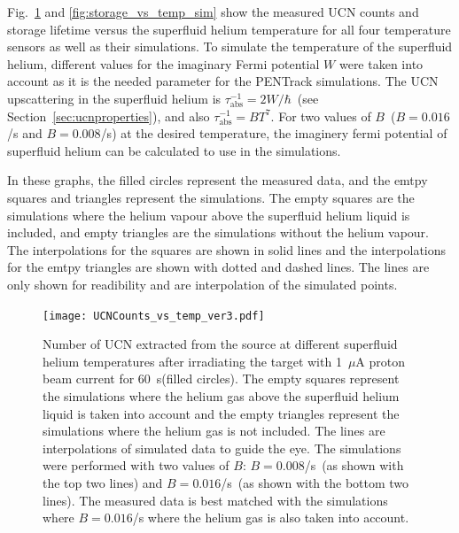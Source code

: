 Fig.~\ref{fig:Counts_vs_temp_sim} and \ref{fig:storage_vs_temp_sim}
show the measured UCN counts and storage lifetime versus the
superfluid helium temperature for all four temperature sensors as well
as their simulations. To simulate the temperature of the superfluid
helium, different values for the imaginary Fermi potential $W$ were
taken into account as it is the needed parameter for the PENTrack
simulations. The UCN upscattering in the superfluid helium is
$\tau_{\mathrm{abs}}^{-1} = 2W/\hbar$~(see
Section~\ref{sec:ucnproperties}), and also
$\tau_{\mathrm{abs}}^{-1} = B T^7$. For two values of
$B$~($B = 0.016$/s and $B = 0.008$/s) at the desired temperature, the
imaginery fermi potential of superfluid helium can be calculated to
use in the simulations.



In these graphs, the filled circles represent the
measured data, and the emtpy squares and triangles represent the
simulations.  The empty squares are the simulations where the helium
vapour above the superfluid helium liquid is included, and empty
triangles are the simulations without the helium vapour. The
interpolations for the squares are shown in solid lines and the
interpolations for the emtpy triangles are shown with dotted and dashed
lines. The lines are only shown for readibility and are interpolation
of the simulated points.



\begin{figure}[h!]
  \centering
  \texttt{[image: UCNCounts\_vs\_temp\_ver3.pdf]}
  \caption[UCN yield versus superfluid helium temperature data and
  simulations]{Number of UCN extracted from the source at different
    superfluid helium temperatures after irradiating the target with
    1~$\mu$A proton beam current for 60~s(filled circles). The empty
    squares represent the simulations where the helium gas above the
    superfluid helium liquid is taken into account and the empty
    triangles represent the simulations where the helium gas is not
    included. The lines are interpolations of simulated data to guide
    the eye. The simulations were performed with two values of $B$:
    $B = 0.008$/s~(as shown with the top two lines) and
    $B = 0.016$/s~(as shown with the bottom two lines). The measured
    data is best matched with the simulations where $B = 0.016$/s
    where the helium gas is also taken into account.}
  \label{fig:Counts_vs_temp_sim}
\end{figure}

